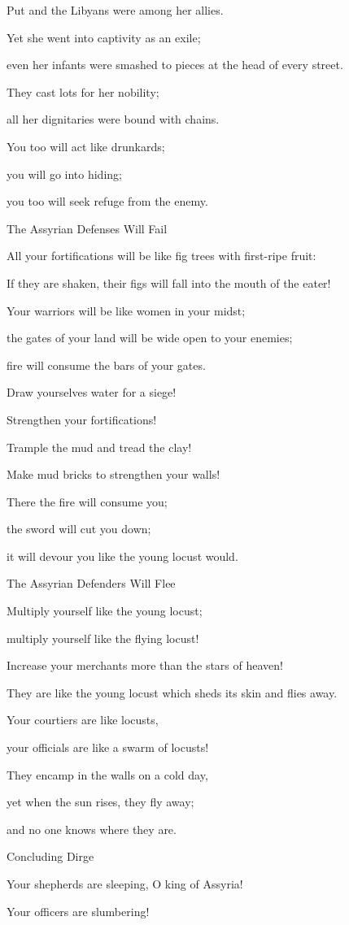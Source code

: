 {\par }{\Q Put
and the Libyans
were among her allies.
\par }{\Q {}Yet
she
went
into captivity
as an exile;
\par }{\Q even
her infants
were smashed
to pieces at the head
of every
street.
\par }{\Q They cast
lots
for her nobility;
\par }{\Q all
her dignitaries
were bound with chains.
\par }{\Q {}You
too
will act like drunkards;
\par }{\Q you
will go into hiding;
\par }{\Q you
too
will seek
refuge
from the enemy.
\par }{\SH The Assyrian Defenses Will Fail
\par }{\Q {}All
your fortifications
will be like fig trees
with
first-ripe fruit:

\par }{\Q If
they are shaken,
their figs will fall
into
the mouth
of the eater!
\par }{\Q {}Your warriors
will be like women
in your midst;
\par }{\Q the gates
of your land
will be wide open
to your enemies;
\par }{\Q fire
will consume
the bars of your gates.
\par }{\Q {}Draw
yourselves water
for a siege!

\par }{\Q Strengthen
your fortifications!
\par }{\Q Trample
the mud
and tread
the clay!
\par }{\Q Make mud bricks
to strengthen your walls!
\par }{\Q {}There
the fire
will consume
you;
\par }{\Q the sword
will cut
you down;
\par }{\Q it will devour
you like the young locust would.
\par }{\SH The Assyrian Defenders Will Flee
\par }{\Q Multiply yourself like the young locust;
\par }{\Q multiply yourself like the flying locust!
\par }{\Q {}Increase
your merchants
more than the stars
of heaven!
\par }{\Q They are like the young locust
which sheds
its skin
and flies away.
\par }{\Q {}Your courtiers
are like locusts,
\par }{\Q your officials
are like a swarm of locusts!
\par }{\Q They encamp in the walls
on a cold
day,
\par }{\Q yet when the sun
rises,
they fly away;
\par }{\Q and no
one knows
where
they are.
\par }{\SH Concluding Dirge
\par }{\Q {}Your shepherds
are sleeping,
O king
of Assyria!
\par }{\Q Your officers
are slumbering!

}
